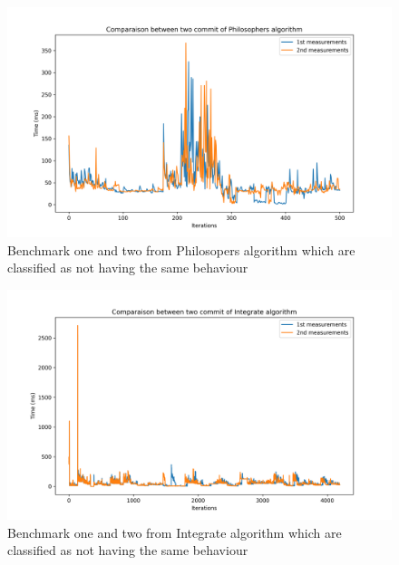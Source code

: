 \documentclass{article}
\begin{document}
\begin{figure}[]
    \centering
    \includegraphics[width=1\textwidth]{images/plot_Philosophers_42.533000000000015.png}
    \caption{Benchmark one and two from Philosopers algorithm which are classified as not having the same behaviour}
    \label{fig:bench_1_2_2}
\end{figure}

\begin{figure}[]
    \centering
    \includegraphics[width=1\textwidth]{images/plot_Integrate_159.78600000000006.png}
    \caption{Benchmark one and two from Integrate algorithm which are classified as not having the same behaviour}
    \label{fig:bench_1_2_3}
\end{figure}
\end{document}
